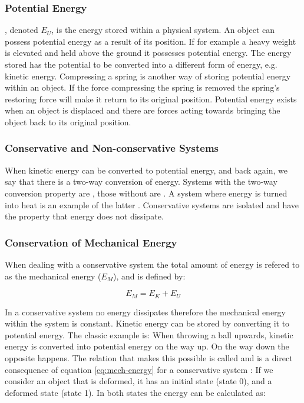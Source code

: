 \subsubsection{Potential Energy}
, denoted $E_U$, is the energy stored within a
physical system. An
object can possess potential energy as a result of its position. If for
example a heavy weight is elevated and held above the ground it
possesses potential energy. The energy stored has the potential to be
converted into a different form of energy, e.g. kinetic
energy. Compressing a spring is another way of storing potential
energy within an object. If the force compressing the spring is
removed the spring's restoring force will make it return to its
original position. Potential energy exists when an object 
is displaced and there are forces acting towards bringing
the object back to its original position. 
%

\subsubsection{Conservative and Non-conservative Systems}
When kinetic energy can be converted to potential energy, and back
again, we say that there is a two-way conversion of energy. Systems
with the two-way conversion property are ,
those without are . A system where
energy is turned into heat is an example of the latter
.
Conservative systems are isolated and have the property that energy
does not dissipate.

\subsubsection{Conservation of Mechanical Energy}
\label{sec:conser-of-me}
When dealing with a conservative system the total amount of
energy is refered to as the mechanical energy ($E_M$), and is defined
by:

\begin{equation}
\label{eq:mech-energy}
E_M = E_K + E_U
\end{equation}

In a conservative system no energy dissipates therefore the mechanical
energy within the system is constant.
Kinetic energy can be stored by converting it to potential energy. The
classic example is: When throwing a ball upwards, kinetic energy is
converted into potential energy on the way up. On the way down the
opposite happens. The relation that makes this possible is called 
 and is a direct consequence
of equation \eqref{eq:mech-energy} for a conservative system
:
%
If we consider an object that is deformed, it has an initial state
(state 0), and a deformed state (state 1). In both states the energy
can be calculated as:

